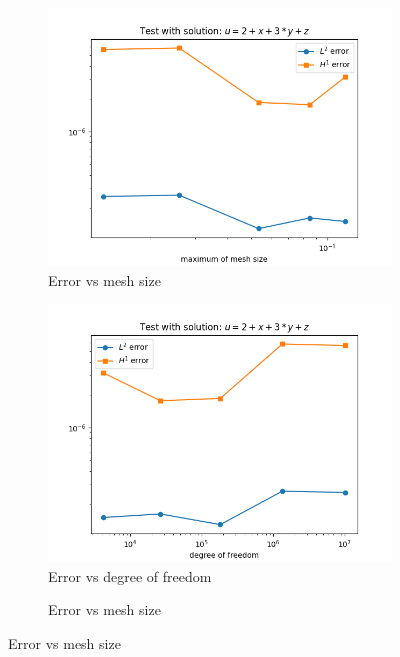 \documentclass[12pt]{article}%
\theoremstyle{plain}
\numberwithin{equation}{section}
\begin{document}
\begin{figure}[H]%
    \centering
         \begin{subfigure}[h]{0.45\linewidth}
          \caption{Error vs mesh size}
\includegraphics[width=\linewidth]{figures/Ex2/Ex2_test.png}
\end{subfigure}
    \begin{subfigure}[h]{0.45\linewidth}
     \caption{Error vs degree of freedom}
\includegraphics[width=\linewidth]{figures/Ex2/Ex2_test_dof.png}
\end{subfigure}
  \begin{subfigure}[h]{0.45\linewidth}
          \caption{Error vs mesh size}

\end{subfigure}
\end{figure}
\end{document}

